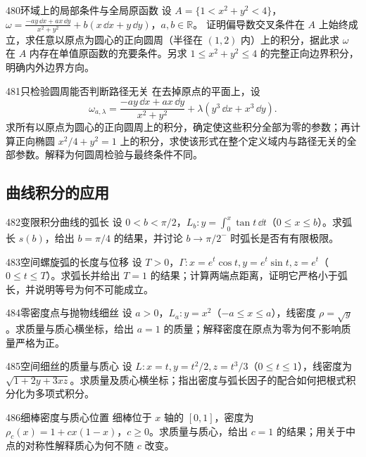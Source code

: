 \begin{exercise}{480}{环域上的局部条件与全局原函数}
设 $A=\{1<x^2+y^2<4\}$，
$\omega=\frac{-ay\,\dd x+ax\,\dd y}{x^2+y^2}+b(x\,\dd x+y\,\dd y)$，$a,b\in\mathbb R$。
证明偏导数交叉条件在 $A$ 上始终成立，求任意以原点为圆心的正向圆周（半径在 $(1,2)$ 内）上的积分，据此求 $\omega$ 在 $A$ 内存在单值原函数的充要条件。另求 $1\leq x^2+y^2\leq4$ 的完整正向边界积分，明确内外边界方向。
\end{exercise}

\begin{exercise}{481}{只检验圆周能否判断路径无关}
在去掉原点的平面上，设
\[
 \omega_{a,\lambda}=\frac{-ay\,\dd x+ax\,\dd y}{x^2+y^2}
 +\lambda(y^3\,\dd x+x^3\,\dd y).
\]
求所有以原点为圆心的正向圆周上的积分，确定使这些积分全部为零的参数；再计算正向椭圆 $x^2/4+y^2=1$ 上的积分，求使该形式在整个定义域内与路径无关的全部参数。解释为何圆周检验与最终条件不同。
\end{exercise}

\subsection{曲线积分的应用}

\begin{exercise}{482}{变限积分曲线的弧长}
设 $0<b<\pi/2$，$L_b:y=\int_0^x\tan t\,\dd t$（$0\leq x\leq b$）。求弧长 $s(b)$，给出 $b=\pi/4$ 的结果，并讨论 $b\to\pi/2^-$ 时弧长是否有有限极限。
\end{exercise}

\begin{exercise}{483}{空间螺旋弧的长度与位移}
设 $T>0$，$\Gamma:x=e^t\cos t,y=e^t\sin t,z=e^t$（$0\leq t\leq T$）。求弧长并给出 $T=1$ 的结果；计算两端点距离，证明它严格小于弧长，并说明等号为何不可能成立。
\end{exercise}

\begin{exercise}{484}{零密度点与抛物线细丝}
设 $a>0$，$L_a:y=x^2$（$-a\leq x\leq a$），线密度 $\rho=\sqrt y$。求质量与质心横坐标，给出 $a=1$ 的质量；解释密度在原点为零为何不影响质量严格为正。
\end{exercise}

\begin{exercise}{485}{空间细丝的质量与质心}
设 $L:x=t,y=t^2/2,z=t^3/3$（$0\leq t\leq1$），线密度为 $\sqrt{1+2y+3xz}$。求质量及质心横坐标；指出密度与弧长因子的配合如何把根式积分化为多项式积分。
\end{exercise}

\begin{exercise}{486}{细棒密度与质心位置}
细棒位于 $x$ 轴的 $[0,1]$，密度为 $\rho_c(x)=1+c x(1-x)$，$c\geq0$。求质量与质心，给出 $c=1$ 的结果；用关于中点的对称性解释质心为何不随 $c$ 改变。
\end{exercise}

